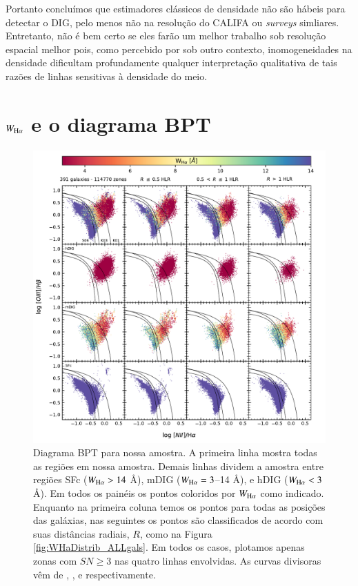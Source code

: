 Portanto concluímos que estimadores clássicos de densidade não são hábeis para detectar o DIG, pelo menos não na resolução do CALIFA ou {\em surveys} simliares. Entretanto, não é bem certo se eles farão um melhor trabalho sob resolução espacial melhor pois, como percebido por \citet{Rubin.1989} sob outro contexto, inomogeneidades na densidade dificultam profundamente qualquer interpretação qualitativa de tais razões de linhas sensitivas à densidade do meio.


\section{$W_{{\rm H}\alpha}$ e o diagrama BPT}
\label{sec:DIGdisc:BPT}

\begin{figure}
 \includegraphics[scale=0.85]{figuras/fig_BPT_per_R.pdf}
 \caption[Diagramas BPT]
 {Diagrama BPT para nossa amostra. A primeira linha mostra todas as regiões em nossa amostra. Demais linhas dividem a amostra entre regiões SFc ($W_{\Ha} > 14$ \AA), mDIG ($W_{\Ha} = 3$--14 \AA), e hDIG ($W_{\Ha} < 3$ \AA). Em todos os painéis os pontos coloridos por $W_{\Ha}$ como indicado. Enquanto na primeira coluna temos os pontos para todas as posições das galáxias, nas seguintes os pontos são classificados de acordo com suas distâncias radiais, $R$, como na Figura \ref{fig:WHaDistrib_ALLgals}. Em todos os casos, plotamos apenas zonas com $SN \ge 3$ nas quatro linhas envolvidas. As curvas divisoras vêm de \citet[S06]{Stasinska.etal.2006a}, \citet[K03]{Kauffmann.etal.2003a}, e \citet[K01]{Kewley.etal.2001a} respectivamente.}
 \label{fig:BPT}
\end{figure}


